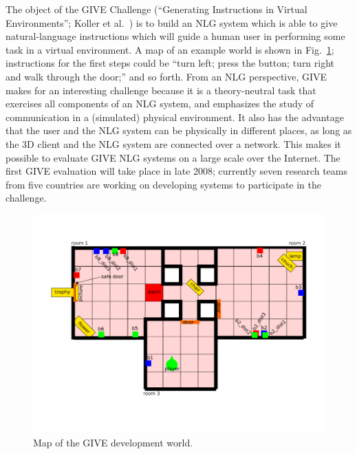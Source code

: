 The object of the GIVE Challenge (``Generating Instructions in Virtual
Environments''; Koller et al.\
\citeyear{alexander07:_shared_task_propos}) is to build an NLG system
which is able to give natural-language instructions which will guide a
human user in performing some task in a virtual environment.  A map of
an example world is shown in Fig.~\ref{fig:give-development-world};
instructions for the first steps could be ``turn left; press the
button; turn right and walk through the door;'' and so forth.  From an
NLG perspective, GIVE makes for an interesting challenge because it is
a theory-neutral task that exercises all components of an NLG system,
and emphasizes the study of communication in a (simulated) physical
environment.  It also has the advantage that the user and the NLG
system can be physically in different places, as long as the 3D client
and the NLG system are connected over a network.  This makes it
possible to evaluate GIVE NLG systems on a large scale over the
Internet.  The first GIVE evaluation will take place in late 2008;
currently seven research teams from five countries are working on
developing systems to participate in the challenge.

\begin{figure}
\centering
\includegraphics[width=1 \columnwidth]{give_world_no_expl}
\caption{Map of the GIVE development world.}
  \label{fig:give-development-world}
\end{figure}



